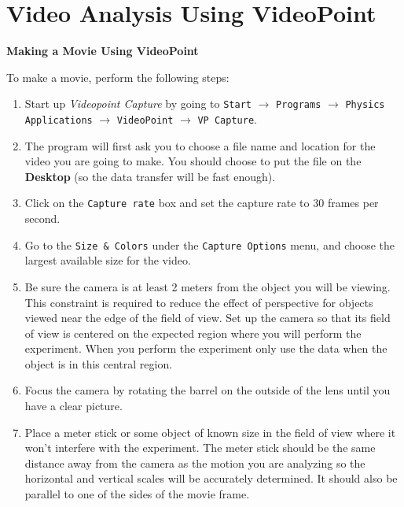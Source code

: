 
\section{Video Analysis Using VideoPoint}

\textbf{Making a Movie Using VideoPoint} 

To make a movie, perform the following steps:

\begin{enumerate}
\item Start up {\it Videopoint Capture} by
going to {\tt Start} $\rightarrow$ {\tt Programs} $\rightarrow$
{\tt Physics Applications} $\rightarrow$ {\tt VideoPoint}
$\rightarrow$ {\tt VP Capture}.
\item The program will first ask you to choose a file name and location for 
the video you are going to make.  You should choose to put the file on the 
\textbf{Desktop} (so the data transfer will be fast enough).

\item Click on the {\tt Capture rate}
box and set the capture rate to 30 frames per second.
\item Go to the {\tt Size \& Colors} under the {\tt Capture Options} 
menu, and choose the largest available size for the video.


\item Be sure the camera is at least 2 meters from the object
you will be viewing. This constraint is required to reduce the effect
of perspective for objects viewed near the edge of the field of view.
Set up the camera so that its field of view is centered on the expected
region where you will perform the experiment. 
When you perform the experiment only use the data when the object is in this central region.

\item Focus the camera by rotating the barrel on the outside
of the lens until you have a clear picture.

\item Place a meter stick or some
object of known size in the field of view where it won't interfere
with the experiment. The meter stick should be the same distance away from
the camera as the motion you are analyzing so the horizontal and vertical 
scales will be accurately determined. It should also be parallel to one of the
sides of the movie frame.


\end{enumerate}
